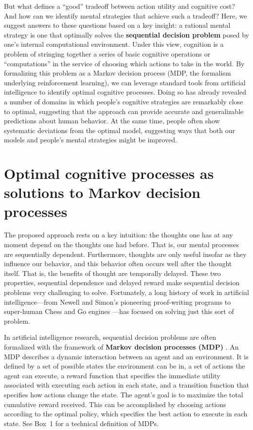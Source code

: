 But what defines a ``good'' tradeoff between action utility and cognitive cost? And how can we identify mental strategies that achieve such a tradeoff? Here, we suggest answers to these questions based on a key insight: a rational mental strategy is one that optimally solves the \textbf{sequential decision problem} posed by one's internal computational environment. Under this view, cognition is a problem of stringing together a series of basic cognitive operations or ``computations'' in the service of choosing which actions to take in the world. By formalizing this problem as a Markov decision process (MDP, the formalism underlying reinforcement learning), we can leverage standard tools from artificial intelligence to identify optimal cognitive processes. Doing so has already revealed a number of domains in which people's cognitive strategies are remarkably close to optimal, suggesting that the approach can provide accurate and generalizable predictions about human behavior. At the same time, people often show systematic deviations from the optimal model, suggesting ways that both our models and people's mental strategies might be improved.


\section{Optimal cognitive processes as solutions to Markov decision processes}

The proposed approach rests on a key intuition: the thoughts one has at any moment depend on the thoughts one had before. That is, our mental processes are sequentially dependent. Furthermore, thoughts are only useful insofar as they influence our behavior, and this behavior often occurs well after the thought itself. That is, the benefits of thought are temporally delayed. These two properties, sequential dependence and delayed reward make sequential decision problems very challenging to solve. Fortunately, a long history of work in artificial intelligence---from Newell and Simon's pioneering proof-writing programs\citep{newell1956logic} to super-human Chess and Go engines \citep{silver2017mastering}---has focused on solving just this sort of problem.

In artificial intelligence research, sequential decision problems are often formalized with the framework of \textbf{Markov decision processes (MDP)} \citep{puterman2014markov,sutton2018reinforcement}. An MDP describes a dynamic interaction between an agent and an environment. It is defined by a set of possible states the environment can be in, a set of actions the agent can execute, a reward function that specifies the immediate utility associated with executing each action in each state, and a transition function that specifies how actions change the state. The agent's goal is to maximize the total cumulative reward received. This can be accomplished by choosing actions according to the optimal policy, which specifies the best action to execute in each state. See Box~1 for a technical definition of MDPs.

